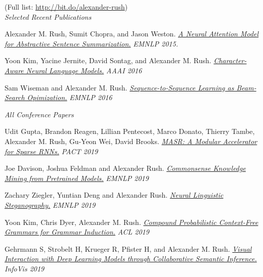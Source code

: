 \documentclass[10pt]{article}
\begin{document}

\noindent (Full list: \url{http://bit.do/alexander-rush}) \\

\medskip
\noindent
\textit{Selected Recent Publications}

\ind Alexander M. Rush, Sumit Chopra, and Jason Weston. \emph{\href{ http://arxiv.org/pdf/1509.00685.pdf }{ A Neural Attention Model for Abstractive Sentence Summarization.} }\emph{ EMNLP 2015. }

\medskip


\ind Yoon Kim, Yacine Jernite, David Sontag, and Alexander M. Rush. \emph{\href{ https://arxiv.org/pdf/1508.06615v4 }{ Character-Aware Neural Language Models.} }\emph{ AAAI 2016 }

\medskip

\ind Sam Wiseman and Alexander M. Rush. \emph{\href{ http://arxiv.org/pdf/1606.02960.pdf }{ Sequence-to-Sequence Learning as Beam-Search Opimization.} }\emph{ EMNLP 2016 }

\medskip
\noindent\emph{All Conference Papers \vspace{0.01in}}


\ind Udit Gupta, Brandon Reagen, Lillian Pentecost, Marco Donato, Thierry Tambe, Alexander M. Rush, Gu-Yeon Wei, David Brooks. \emph{\href{ None }{ MASR: A Modular Accelerator for Sparse RNNs.} }\emph{ PACT 2019 }

\medskip


\ind Joe Davison, Joshua Feldman and Alexander Rush. \emph{\href{ None }{ Commonsense Knowledge Mining from Pretrained Models.} }\emph{ EMNLP 2019 }

\medskip


\ind Zachary Ziegler, Yuntian Deng and Alexander Rush. \emph{\href{ https://arxiv.org/abs/1909.01496 }{ Neural Linguistic Steganography.} }\emph{ EMNLP 2019 }

\medskip


\ind Yoon Kim,  Chris Dyer, Alexander M. Rush. \emph{\href{ https://arxiv.org/pdf/1906.06399.pdf }{ Compound Probabilistic Context-Free Grammars for Grammar Induction.} }\emph{ ACL 2019 }

\medskip


\ind Gehrmann S, Strobelt H, Krueger R, Pfister H, and Alexander M. Rush. \emph{\href{ https://arxiv.org/abs/1907.10739 }{ Visual Interaction with Deep Learning Models through Collaborative Semantic Inference.} }\emph{ InfoVis 2019 }

\medskip
\end{document}
